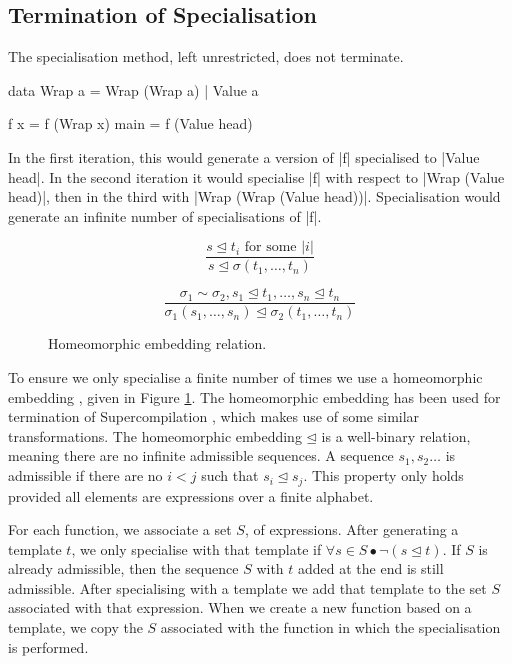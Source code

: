 \documentclass[preprint]{sigplanconf}
\begin{document}
\subsection{Termination of Specialisation}
\label{sec:termination_specialisation}

The specialisation method, left unrestricted, does not terminate.

\begin{example}
\begin{code}
data Wrap a  =  Wrap (Wrap a)
             |  Value a

f x = f (Wrap x)
main = f (Value head)
\end{code}

In the first iteration, this would generate a version of |f| specialised to |Value head|. In the second iteration it would specialise |f| with respect to |Wrap (Value head)|, then in the third with |Wrap (Wrap (Value head))|. Specialisation would generate an infinite number of specialisations of |f|.
\end{example}

\begin{figure}
\[\frac{s \unlhd t_i \text{ for some } |i|}{s \unlhd \sigma(t_1,\ldots,t_n)} \]

\[\frac{\sigma_1 \sim \sigma_2,
        s_1 \unlhd t_1, \ldots , s_n \unlhd t_n}
       {\sigma_1 (s_1,\ldots,s_n) \unlhd \sigma_2 (t_1,\ldots,t_n)} \]
\caption{Homeomorphic embedding relation.}
\label{fig:homeomorphic}
\end{figure}

To ensure we only specialise a finite number of times we use a homeomorphic embedding \cite{leuschel:homeomorphic}, given in Figure \ref{fig:homeomorphic}. The homeomorphic embedding has been used for termination of Supercompilation \cite{sorensen:supercompilation}, which makes use of some similar transformations. The homeomorphic embedding $\unlhd$ is a well-binary relation, meaning there are no infinite admissible sequences. A sequence $s_1,s_2 \ldots$ is admissible if there are no $i < j$ such that $s_i \unlhd s_j$. This property only holds provided all elements are expressions over a finite alphabet.

For each function, we associate a set $S$, of expressions. After generating a template $t$, we only specialise with that template if $\forall s \in S \bullet \neg(s \unlhd t)$. If $S$ is already admissible, then the sequence $S$ with $t$ added at the end is still admissible. After specialising with a template we add that template to the set $S$ associated with that expression. When we create a new function based on a template, we copy the $S$ associated with the function in which the specialisation is performed.
\end{document}
